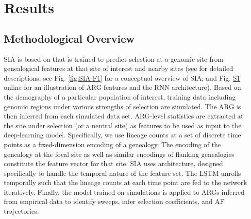 \section{Results}
\subsection{Methodological Overview}
\ac{SIA} is based on  that is trained to predict selection at a genomic site from genealogical features at that site of interest and nearby sites (see  for detailed descriptions; see Fig. \ref{fig:SIA-F1} for a conceptual overview of \ac{SIA}; and Fig. \href{https://academic.oup.com/mbe/article/39/1/msab332/6433161#supplementary-data}{S1} online for an illustration of \ac{ARG} features and the \ac{RNN} architecture). Based on the demography of a particular population of interest, training data including genomic regions under various strengths of selection are simulated. The \ac{ARG} is then inferred from each simulated data set. \ac{ARG}-level statistics are extracted at the site under selection (or a neutral site) as features to be used as input to the deep-learning model. Specifically, we use lineage counts at a set of discrete time points as a fixed-dimension encoding of a genealogy. The encoding of the genealogy at the focal site as well as similar encodings of flanking genealogies constitute the feature vector for that site. \ac{SIA} uses  architecture, designed specifically to handle the temporal nature of the feature set. The \ac{LSTM} unrolls temporally such that the lineage counts at each time point are fed to the network iteratively. Finally, the model trained on simulations is applied to \acp{ARG} inferred from empirical data to identify sweeps, infer selection coefficients, and \ac{AF} trajectories.

